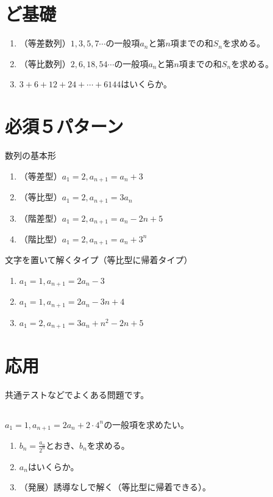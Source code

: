 \documentclass[12pt,a4paper]{jsarticle}
\begin{document}
\section{ど基礎}
\begin{enumerate}
    \item （等差数列）$1,3,5,7\cdots$の一般項$a_n$と第$n$項までの和$S_n$を求める。
    \item （等比数列）$2,6,18,54\cdots$の一般項$a_n$と第$n$項までの和$S_n$を求める。
    \item $3+6+12+24+\cdots +6144$はいくらか。
\end{enumerate}
\section{必須５パターン}
数列の基本形
\begin{enumerate}
    \item （等差型）$a_1=2, a_{n+1}=a_n +3$
    \item （等比型）$a_1=2, a_{n+1}=3 a_n$
    \item （階差型）$a_1=2, a_{n+1}=a_n -2n+5$
    \item （階比型）$a_1=2, a_{n+1}=a_n +3^n$
\end{enumerate}
文字を置いて解くタイプ（等比型に帰着タイプ）
\begin{enumerate}
    \item $a_1=1, a_{n+1}=2 a_n -3$
    \item $a_1=1, a_{n+1}=2 a_n -3n+4$
    \item $a_1=2, a_{n+1}=3a_n+n^2 -2n +5$
\end{enumerate}
\section{応用}
共通テストなどでよくある問題です。
\subsection{}
$a_1=1,a_{n+1}=2a_{n}+2\cdot 4^n$の一般項を求めたい。
\begin{enumerate}
    \item $b_n=\frac{a_n}{2^n}$とおき、$b_n$を求める。
    \item $a_n$はいくらか。
    \item （発展）誘導なしで解く（等比型に帰着できる）。
\end{enumerate}
\end{document}
